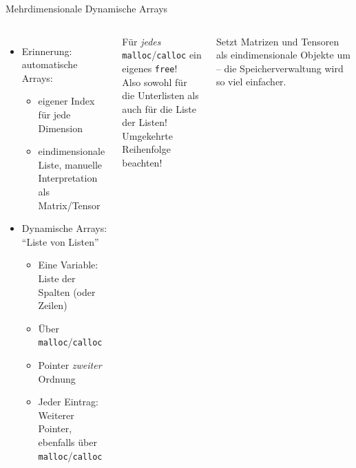 \begin{frame}[fragile]{Mehrdimensionale Dynamische Arrays}
%
\begin{columns}[T]
\begin{itemize}
\item Erinnerung: automatische Arrays:
	\begin{itemize}
	\item eigener Index für jede Dimension
	\item eindimensionale Liste, manuelle Interpretation als Matrix/Tensor
	\end{itemize}
\item Dynamische Arrays: \enquote{Liste von Listen}
	\begin{itemize}
	\item Eine Variable: Liste der Spalten (oder Zeilen)
	\item Über \texttt{malloc}/\texttt{calloc}
	\item Pointer \emph{zweiter} Ordnung
	\item Jeder Eintrag: Weiterer Pointer, ebenfalls über \texttt{malloc}/\texttt{calloc}
	\end{itemize}
\end{itemize}
%
\vspace{-10pt}
\begin{warnbox}
Für \emph{jedes} \texttt{malloc}/\texttt{calloc} ein eigenes \texttt{free}!\\
Also sowohl für die Unterlisten als auch für die Liste der Listen!\\
Umgekehrte Reihenfolge beachten!
\end{warnbox}
\begin{hintbox}
Setzt Matrizen und Tensoren als eindimensionale Objekte um -- die Speicherverwaltung wird so viel einfacher.
\end{hintbox}
\end{columns}
%
\end{frame}


